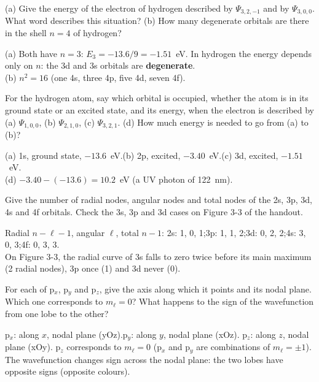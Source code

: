 (a) Give the energy of the electron of hydrogen described by $\Psi_{3,2,-1}$ and by $\Psi_{3,0,0}$.
What word describes this situation? (b) How many degenerate orbitals are there in the shell $n = 4$ of
hydrogen?
\begin{solution}
(a) Both have $n = 3$: $E_3 = -13.6/9 = -1.51$~eV. In hydrogen the energy depends only on $n$: the 3d
and 3s orbitals are \textbf{degenerate}.\\
(b) $n^2 = 16$ (one 4s, three 4p, five 4d, seven 4f).
\end{solution}

For the hydrogen atom, say which orbital is occupied, whether the atom is in its ground state or an
excited state, and its energy, when the electron is described by (a) $\Psi_{1,0,0}$,
(b) $\Psi_{2,1,0}$, (c) $\Psi_{3,2,1}$. (d) How much energy is needed to go from (a) to (b)?
\begin{solution}
(a) 1s, ground state, $-13.6$~eV.\quad (b) 2p, excited, $-3.40$~eV.\quad (c) 3d, excited, $-1.51$~eV.\\
(d) $-3.40 - (-13.6) = 10.2$~eV (a UV photon of 122~nm).
\end{solution}

Give the number of radial nodes, angular nodes and total nodes of the 2s, 3p, 3d, 4s and 4f orbitals.
Check the 3s, 3p and 3d cases on Figure 3-3 of the handout.
\begin{solution}
Radial $n-\ell-1$, angular $\ell$, total $n-1$:\quad
2s: 1, 0, 1;\quad 3p: 1, 1, 2;\quad 3d: 0, 2, 2;\quad 4s: 3, 0, 3;\quad 4f: 0, 3, 3.\\
On Figure 3-3, the radial curve of 3s falls to zero twice before its main maximum (2 radial nodes),
3p once (1) and 3d never (0).
\end{solution}

For each of p$_x$, p$_y$ and p$_z$, give the axis along which it points and its nodal plane. Which
one corresponds to $m_\ell = 0$? What happens to the sign of the wavefunction from one lobe to the other?
\begin{solution}
p$_x$: along $x$, nodal plane (yOz).\quad p$_y$: along $y$, nodal plane (xOz).\quad
p$_z$: along $z$, nodal plane (xOy). p$_z$ corresponds to $m_\ell = 0$ (p$_x$ and p$_y$ are combinations of
$m_\ell = \pm1$). The wavefunction changes sign across the nodal plane: the two lobes have opposite
signs (opposite colours).
\end{solution}

